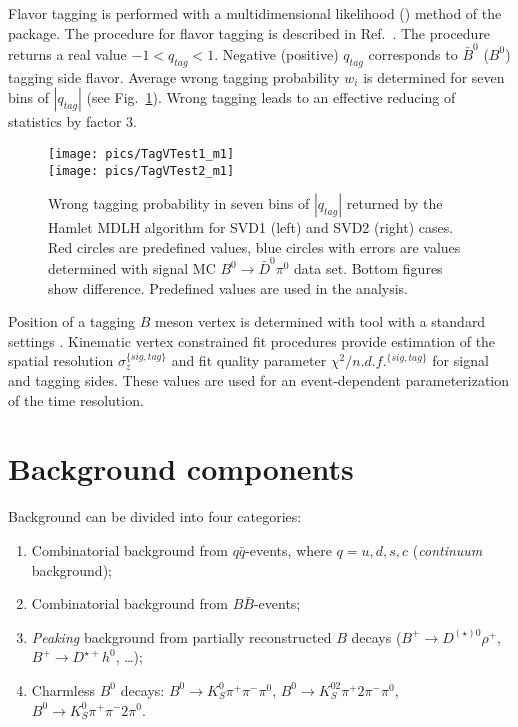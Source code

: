 \documentclass[preprint,aps,showpacs]{revtex4}
\newcommand{\cpvconj}{\ensuremath{\mathcal{CPV}}\xspace}
\newcommand{\bdpi}{\ensuremath{B^0\to \bar D^0\pi^0}\xspace}
\begin{document}
Flavor tagging is performed with a multidimensional likelihood (\verb@MDLH@) method of the \verb@Hamlet@ package. The procedure for flavor tagging is described in Ref.~\cite{TaggingNIM}. The \verb@MDLH@ procedure returns a real value $-1<q_{tag}<1$. Negative (positive) $q_{tag}$ corresponds to $\bar B^0$ ($B^0$) tagging side flavor.
Average wrong tagging probability $w_i$ is determined for seven bins of $|q_{tag}|$ (see Fig.~\ref{fig:wtag}).
Wrong tagging leads to an effective reducing of statistics by factor $3$.

\begin{figure}[htb]
 \texttt{[image: pics/TagVTest1\_m1]}\\
 \texttt{[image: pics/TagVTest2\_m1]}
 \caption{Wrong tagging probability in seven bins of $|q_{tag}|$ returned by the Hamlet MDLH algorithm for SVD1 (left) and SVD2 (right) cases. Red circles are predefined values, blue circles with errors are values determined with signal MC \bdpi data set. Bottom figures show difference. Predefined values are used in the analysis.}
 \label{fig:wtag}
\end{figure}

Position of a tagging $B$ meson vertex is determined with \verb@TagVertex@ tool with a standard settings \cite{vertexres}.
Kinematic vertex constrained fit procedures provide estimation of the spatial resolution $\sigma_{z}^{\{sig,tag\}}$ and fit quality parameter $\chi^2/n.d.f.^{\{sig,tag\}}$ for signal and tagging sides. These values are used for an event-dependent parameterization of the time resolution.%

\clearpage
\section{Background components}
Background can be divided into four categories:
\begin{enumerate}
 \item Combinatorial background from $q\bar q$-events, where $q=u,d,s,c$ ({\it continuum} background);
 \item Combinatorial background from $B\bar B$-events;
 \item {\it Peaking} background from partially reconstructed $B$ decays ($B^+\to D^{(\star)0}\rho^+$, $B^+\to D^{\star+}h^0$, \dots);
 \item Charmless $B^0$ decays: $B^0\to K_S^0\pi^+\pi^-\pi^0$, $B^0\to K_S^02\pi^+2\pi^-\pi^0$, $B^0\to K_S^0\pi^+\pi^-2\pi^0$.
\end{enumerate}
\end{document}
